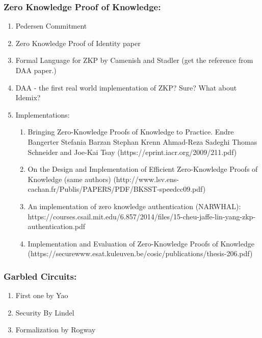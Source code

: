 \documentclass[11pt]{article}
\begin{document}
\subsubsection*{Zero Knowledge Proof of Knowledge:}
\begin{enumerate}
 \item Pedersen Commitment
 \item Zero Knowledge Proof of Identity paper
 \item Formal Language for ZKP by Camenish and Stadler (get the reference from DAA paper.)
 \item DAA - the first real world implementation of ZKP? Sure? What about Idemix?
 \item Implementations:
  \begin{enumerate}
   \item Bringing Zero-Knowledge Proofs of Knowledge to Practice. Endre Bangerter Stefania Barzan Stephan Krenn Ahmad-Reza Sadeghi Thomas Schneider 
and Joe-Kai Tsay (https://eprint.iacr.org/2009/211.pdf)
  \item On the Design and Implementation of Efficient Zero-Knowledge Proofs of Knowledge (same authors) 
(http://www.lsv.ens-cachan.fr/Publis/PAPERS/PDF/BKSST-speedcc09.pdf)
  \item An implementation of zero knowledge authentication (NARWHAL): 
https://courses.csail.mit.edu/6.857/2014/files/15-cheu-jaffe-lin-yang-zkp-authentication.pdf
  \item Implementation and Evaluation of Zero-Knowledge Proofs of Knowledge (https://securewww.esat.kuleuven.be/cosic/publications/thesis-206.pdf)
 \end{enumerate}
\end{enumerate}

\subsubsection*{Garbled Circuits:}
\begin{enumerate}
 \item First one by Yao
 \item Security By Lindel
 \item Formalization by Rogway
\end{enumerate}
\end{document}
